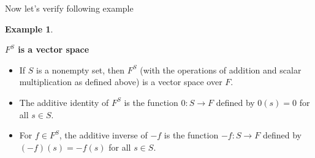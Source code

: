 \documentclass[
]{book}
\providecommand{\tightlist}{%
  \setlength{\itemsep}{0pt}\setlength{\parskip}{0pt}}
\theoremstyle{definition}
\theoremstyle{definition}
\newtheorem{example}{Example}[chapter]
\theoremstyle{definition}
\theoremstyle{definition}
\theoremstyle{remark}
\begin{document}
Now let's verify following example

\begin{example}
\protect\hypertarget{exm:unnamed-chunk-30}{}\label{exm:unnamed-chunk-30}

\textbf{\(F^S\) is a vector space}

\begin{itemize}
\tightlist
\item
  If \(S\) is a nonempty set, then \(F^S\) (with the operations of addition and scalar multiplication as defined above) is a vector space over \(F\).
\item
  The additive identity of \(F^S\) is the function \(0 \colon S \rightarrow F\) defined by \(0(s) = 0\) for all \(s \in S\).
\item
  For \(f \in F^S\), the additive inverse of \(-f\) is the function \(-f \colon S \rightarrow F\) defined by \((-f)(s) = -f(s)\) for all \(s \in S\).
\end{itemize}

\end{example}
\end{document}
